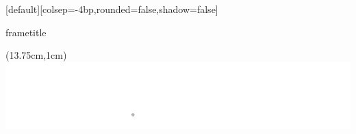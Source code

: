 

[default][colsep=-4bp,rounded=false,shadow=false]
{%
    \nointerlineskip%
    \begin{beamercolorbox}[wd=\paperwidth,ht=3.5ex,dp=0.6ex]{frametitle}
        \hspace*{1.3ex}\insertframetitle%
        
        \hspace*{1.3ex}\small\insertframesubtitle%
    \end{beamercolorbox}%
    \begin{textblock*}{100mm}(13.75cm,1cm)
        \includegraphics[height=.4cm,keepaspectratio]{../shared/Logo_GTCMT_white}
    \end{textblock*}
}


